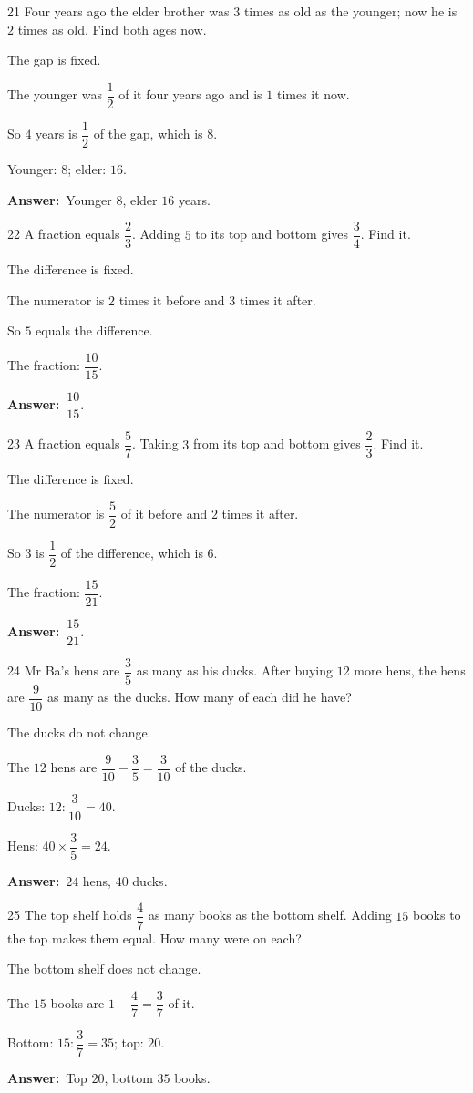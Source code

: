 \documentclass[11pt]{article}
\newif\ifsol \solfalse
\providecommand{\AnsWord}{Đáp số}
\newcommand{\dapso}[1]{\par\textbf{\AnsWord:}\ #1}
\newcommand{\probsol}[1]{%
  \begin{lrbox}{\solmeasure}\begin{minipage}{\dimexpr\linewidth-24pt\relax}#1\end{minipage}\end{lrbox}%
  \ifsol
    \begin{solbox}#1\end{solbox}%
  \else
    \setlength{\solht}{\dimexpr\ht\solmeasure+\dp\solmeasure+0.85cm\relax}%
    \ifdim\solht<1.35cm\setlength{\solht}{1.35cm}\fi
    \begin{tcolorbox}[colback=white,colframe=Line,boxrule=0.8pt,arc=5pt,
      left=8pt,right=8pt,top=4pt,bottom=4pt,height=\solht]{\footnotesize\color{Slate}\itshape\WorkWord}\end{tcolorbox}%
  \fi}
\newcommand{\gap}{\vspace{0.3cm}}
\def\WorkWord{Your work:}
\def\AnsWord{Answer}
\begin{document}
\gap
\begin{probbox}{21}{\relax}
Four years ago the elder brother was $3$ times as old as the younger; now he is $2$ times as old. Find both ages now.
\end{probbox}
\probsol{
The gap is fixed.\par The younger was $\dfrac12$ of it four years ago and is $1$ times it now.\par So $4$ years is $\dfrac12$ of the gap, which is $8$.\par Younger: $8$; elder: $16$.
\dapso{Younger $8$, elder $16$ years.}}
\gap
\begin{probbox}{22}{\relax}
A fraction equals $\dfrac23$. Adding $5$ to its top and bottom gives $\dfrac34$. Find it.
\end{probbox}
\probsol{
The difference is fixed.\par The numerator is $2$ times it before and $3$ times it after.\par So $5$ equals the difference.\par The fraction: $\dfrac{10}{15}$.
\dapso{$\dfrac{10}{15}$.}}
\gap
\begin{probbox}{23}{\relax}
A fraction equals $\dfrac57$. Taking $3$ from its top and bottom gives $\dfrac23$. Find it.
\end{probbox}
\probsol{
The difference is fixed.\par The numerator is $\dfrac52$ of it before and $2$ times it after.\par So $3$ is $\dfrac12$ of the difference, which is $6$.\par The fraction: $\dfrac{15}{21}$.
\dapso{$\dfrac{15}{21}$.}}
\gap
\begin{probbox}{24}{\relax}
Mr Ba's hens are $\dfrac35$ as many as his ducks. After buying $12$ more hens, the hens are $\dfrac9{10}$ as many as the ducks. How many of each did he have?
\end{probbox}
\probsol{
The ducks do not change.\par The $12$ hens are $\dfrac9{10}-\dfrac35=\dfrac3{10}$ of the ducks.\par Ducks: $12:\dfrac3{10}=40$.\par Hens: $40\times\dfrac35=24$.
\dapso{$24$ hens, $40$ ducks.}}
\gap
\begin{probbox}{25}{\relax}
The top shelf holds $\dfrac47$ as many books as the bottom shelf. Adding $15$ books to the top makes them equal. How many were on each?
\end{probbox}
\probsol{
The bottom shelf does not change.\par The $15$ books are $1-\dfrac47=\dfrac37$ of it.\par Bottom: $15:\dfrac37=35$; top: $20$.
\dapso{Top $20$, bottom $35$ books.}}
\end{document}

